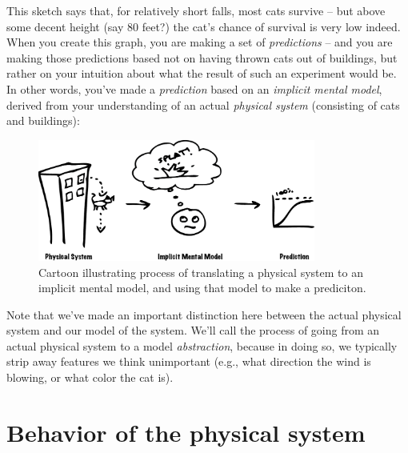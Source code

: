 This sketch says that, for relatively short falls, most cats survive -- but above some decent height (say 80 feet?) the cat's chance of survival is very low indeed.  When you create this graph, you are making a set of {\it predictions} -- and you are making those predictions based not on having thrown cats out of buildings, but rather on your intuition about what the result of such an experiment would be.  In other words, you've made a {\it prediction} based on an {\it implicit mental model}, derived from your understanding of an actual {\it physical system} (consisting of cats and buildings):

\begin{figure}[h!]
\centerline{\includegraphics[height=4cm]{figs/SystemImplicitModelPrediction}}
\caption{Cartoon illustrating process of translating a physical system to an implicit mental model, and using that model to make a prediciton.}
\end{figure}


Note that we've made an important distinction here between the actual physical system and our model of the system.  We'll call the process of going from an actual physical system to a model {\it abstraction}, because in doing so, we typically strip away features we think unimportant (e.g., what direction the wind is blowing, or what color the cat is).
\section{Behavior of the physical system}

